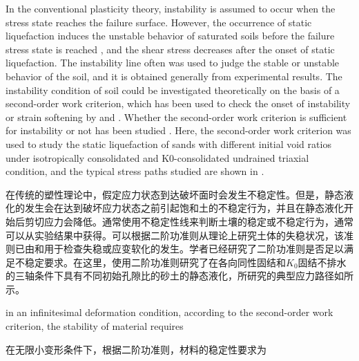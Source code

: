\begin{ParaColumn}
    
    In the conventional plasticity theory, instability is assumed to occur when the stress state reaches the failure surface. However, the occurrence of static liquefaction induces the unstable behavior of saturated soils before the failure stress state is reached \citep{Daouadji2010}, and the shear stress decreases after the onset of static liquefaction. The instability line often was used to judge the stable or unstable behavior of the soil, and it is obtained generally from experimental results. The instability condition of soil could be investigated theoretically on the basis of a second-order work criterion, which has been used to check the onset of instability or strain softening by \citet{Valanis1985} and \citet{Chu1992}. Whether the second-order work criterion is sufficient for instability or not has been studied \citep{Lade1987, Lade1988, Chu1993, Chu2009}. Here, the second-order work criterion was used to study the static liquefaction of sands with different initial void ratios under isotropically consolidated and K0-consolidated undrained triaxial condition, and the typical stress paths studied are shown in .

    \switchcolumn

    在传统的塑性理论中，假定应力状态到达破坏面时会发生不稳定性。但是，静态液化的发生会在达到破坏应力状态之前引起饱和土的不稳定行为\citep{Daouadji2010}，并且在静态液化开始后剪切应力会降低。通常使用不稳定性线来判断土壤的稳定或不稳定行为，通常可以从实验结果中获得。可以根据二阶功准则从理论上研究土体的失稳状况，该准则已由\citet{Valanis1985}和\citet{Chu1992}用于检查失稳或应变软化的发生。学者已经研究了二阶功准则是否足以满足不稳定要求\citep{Lade1987, Lade1988, Chu1993, Chu2009}。在这里，使用二阶功准则研究了在各向同性固结和$K_0$固结不排水的三轴条件下具有不同初始孔隙比的砂土的静态液化，所研究的典型应力路径如所示。

    \CrossColumnText{
        
    }
    \switchcolumn*

    in an infinitesimal deformation condition, according to the second-order work criterion, the stability of material requires

    \switchcolumn

    在无限小变形条件下，根据二阶功准则，材料的稳定性要求为

    \switchcolumn*


\end{ParaColumn}
